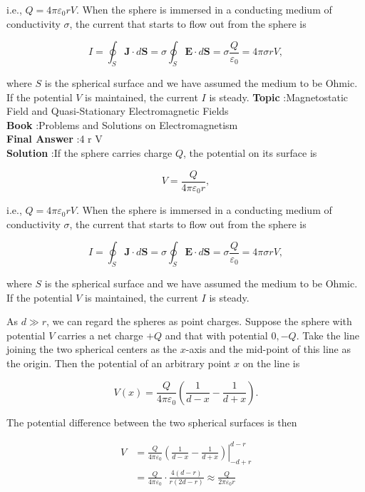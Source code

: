 \documentclass[10pt]{article}
\begin{document}
i.e., $Q=4 \pi \varepsilon_{0} r V$. When the sphere is immersed in a conducting medium of conductivity $\sigma$, the current that starts to flow out from the sphere is

$$
I=\oint_{S} \mathbf{J} \cdot d \mathbf{S}=\sigma \oint_{S} \mathbf{E} \cdot d \mathbf{S}=\sigma \frac{Q}{\varepsilon_{0}}=4 \pi \sigma r V,
$$

where $S$ is the spherical surface and we have assumed the medium to be Ohmic. If the potential $V$ is maintained, the current $I$ is steady.
\textbf{Topic} :Magnetostatic Field and Quasi-Stationary Electromagnetic Fields\\
\textbf{Book} :Problems and Solutions on Electromagnetism\\
\textbf{Final Answer} :4 \pi \sigma r V\\


\textbf{Solution} :If the sphere carries charge $Q$, the potential on its surface is

$$
V=\frac{Q}{4 \pi \varepsilon_{0} r},
$$

i.e., $Q=4 \pi \varepsilon_{0} r V$. When the sphere is immersed in a conducting medium of conductivity $\sigma$, the current that starts to flow out from the sphere is

$$
I=\oint_{S} \mathbf{J} \cdot d \mathbf{S}=\sigma \oint_{S} \mathbf{E} \cdot d \mathbf{S}=\sigma \frac{Q}{\varepsilon_{0}}=4 \pi \sigma r V,
$$

where $S$ is the spherical surface and we have assumed the medium to be Ohmic. If the potential $V$ is maintained, the current $I$ is steady.

 As $d \gg r$, we can regard the spheres as point charges. Suppose the sphere with potential $V$ carries a net charge $+Q$ and that with potential $0,-Q$. Take the line joining the two spherical centers as the $x$-axis and the mid-point of this line as the origin. Then the potential of an arbitrary point $x$ on the line is

$$
V(x)=\frac{Q}{4 \pi \varepsilon_{0}}\left(\frac{1}{d-x}-\frac{1}{d+x}\right) .
$$

The potential difference between the two spherical surfaces is then

$$
\begin{aligned}
V &=\left.\frac{Q}{4 \pi \varepsilon_{0}}\left(\frac{1}{d-x}-\frac{1}{d+x}\right)\right|_{-d+r} ^{d-r} \\
&=\frac{Q}{4 \pi \varepsilon_{0}} \cdot \frac{4(d-r)}{r(2 d-r)} \approx \frac{Q}{2 \pi \varepsilon_{0} r}
\end{aligned}
$$
\end{document}
